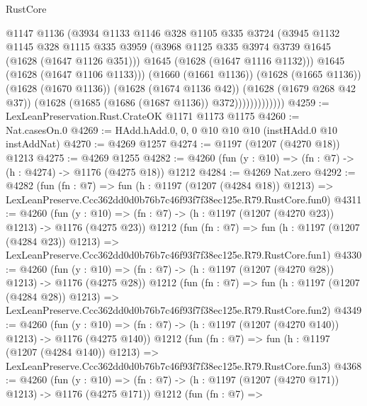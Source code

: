 \begin{lexlean}{RustCore}
\begin{coremodule}
                          @1147
                          @1136
                          (@3934
                            @1133
                            @1146
                            @328
                            @1105
                            @335
                            @3724
                            (@3945
                              @1132
                              @1145
                              @328
                              @1115
                              @335
                              @3959
                              (@3968 @1125 @335 @3974 @3739 @1645 (@1628 (@1647 @1126 @351)))
                              @1645
                              (@1628 (@1647 @1116 @1132)))
                            @1645
                            (@1628 (@1647 @1106 @1133)))
                          (@1660 (@1661 @1136))
                          (@1628 (@1665 @1136))
                          (@1628 (@1670 @1136))
                          (@1628 (@1674 @1136 @42))
                          (@1628 (@1679 @268 @42 @37))
                          (@1628 (@1685 (@1686 (@1687 @1136)) @372)))))))))))))
@4259 := LexLeanPreservation.Rust.CrateOK @1171 @1173 @1175
@4260 := Nat.casesOn.{0}
@4269 := HAdd.hAdd.{0, 0, 0} @10 @10 @10 (instHAdd.{0} @10 instAddNat)
@4270 := @4269 @1257
@4274 := @1197 (@1207 (@4270 @18)) @1213
@4275 := @4269 @1255
@4282 := @4260 (fun (y : @10) => (fn : @7) -> (h : @4274) -> @1176 (@4275 @18)) @1212
@4284 := @4269 Nat.zero
@4292 := @4282
    (fun (fn : @7) =>
    fun (h : @1197 (@1207 (@4284 @18)) @1213) =>
    LexLeanPreserve.Ccc362dd0d0b76b7c46f93f7f38ec125e.R79.RustCore.fun0)
@4311 := @4260
    (fun (y : @10) => (fn : @7) -> (h : @1197 (@1207 (@4270 @23)) @1213) -> @1176 (@4275 @23))
    @1212
    (fun (fn : @7) =>
    fun (h : @1197 (@1207 (@4284 @23)) @1213) =>
    LexLeanPreserve.Ccc362dd0d0b76b7c46f93f7f38ec125e.R79.RustCore.fun1)
@4330 := @4260
    (fun (y : @10) => (fn : @7) -> (h : @1197 (@1207 (@4270 @28)) @1213) -> @1176 (@4275 @28))
    @1212
    (fun (fn : @7) =>
    fun (h : @1197 (@1207 (@4284 @28)) @1213) =>
    LexLeanPreserve.Ccc362dd0d0b76b7c46f93f7f38ec125e.R79.RustCore.fun2)
@4349 := @4260
    (fun (y : @10) => (fn : @7) -> (h : @1197 (@1207 (@4270 @140)) @1213) -> @1176 (@4275 @140))
    @1212
    (fun (fn : @7) =>
    fun (h : @1197 (@1207 (@4284 @140)) @1213) =>
    LexLeanPreserve.Ccc362dd0d0b76b7c46f93f7f38ec125e.R79.RustCore.fun3)
@4368 := @4260
    (fun (y : @10) => (fn : @7) -> (h : @1197 (@1207 (@4270 @171)) @1213) -> @1176 (@4275 @171))
    @1212
    (fun (fn : @7) =>

\end{coremodule}
\end{lexlean}
